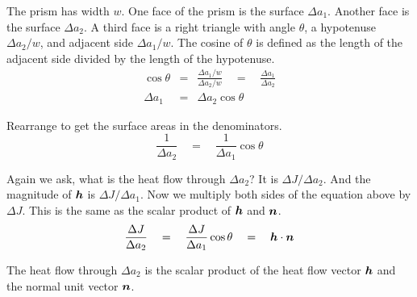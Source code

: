 The prism has width $w$.
One face of the prism is the surface $\Delta a_1$.
Another face is the surface $\Delta a_2$.
A third face is a right triangle with angle $\theta$,
a hypotenuse $\Delta a_2/w$, and adjacent side $\Delta a_1/w$.
The cosine of $\theta$ is defined as the length of the adjacent side
divided by the length of the hypotenuse.
\begin{eqnarray*}
  \cos \theta &=& \frac{\Delta a_1/w}{\Delta a_2/w} \quad = \quad \frac{\Delta a_1}{\Delta a_2} \\
  \Delta a_1 &=& \Delta a_2 \cos \theta
\end{eqnarray*}

Rearrange to get the surface areas in the denominators.
\begin{equation*}
  \frac{1}{\Delta a_2} \quad = \quad \frac{1}{\Delta a_1} \cos \theta
\end{equation*}

Again we ask, what is the heat flow through $\Delta a_2$?
It is $\Delta J / \Delta a_2$.
And the magnitude of $\boldsymbol{h}$ is $\Delta J / \Delta a_1$.
Now we multiply both sides of the equation above by $\Delta J$.
This is the same as the scalar product of $\boldsymbol{h}$ and $\boldsymbol{n}$.
\begin{equation}
  \frac{\Delta J}{\Delta a_2} \quad = \quad
  \frac{\Delta J}{\Delta a_1} \cos \theta \quad = \quad
  \boldsymbol{h} \cdot \boldsymbol{n}
\end{equation}

The heat flow through $\Delta a_2$ is the scalar product
of the heat flow vector $\boldsymbol{h}$ and the normal unit vector $\boldsymbol{n}$.



